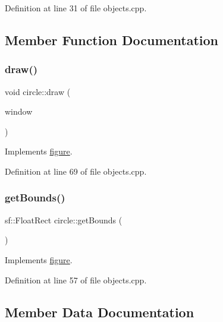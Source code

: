 Definition at line 31 of file objects.\+cpp.



\subsection{Member Function Documentation}
\mbox{\label{classcircle_a49a37a81d863f524935be5953142886a}} 
\subsubsection{\texorpdfstring{draw()}{draw()}}
{\footnotesize\ttfamily void circle\+::draw (\begin{DoxyParamCaption}\item[{sf\+::\+Render\+Window \&}]{window }\end{DoxyParamCaption})\hspace{0.3cm}{\ttfamily [virtual]}}



Implements \hyperlink{classfigure_a56d8a53a8bf2b82178aa476bac071596}{figure}.



Definition at line 69 of file objects.\+cpp.

\mbox{\label{classcircle_a8e0193c47ce75d0aed9b3501dbdd0499}} 
\subsubsection{\texorpdfstring{get\+Bounds()}{getBounds()}}
{\footnotesize\ttfamily sf\+::\+Float\+Rect circle\+::get\+Bounds (\begin{DoxyParamCaption}{ }\end{DoxyParamCaption})\hspace{0.3cm}{\ttfamily [virtual]}}



Implements \hyperlink{classfigure_aca9a3924bc0883e1aa8e93c04887abbc}{figure}.



Definition at line 57 of file objects.\+cpp.



\subsection{Member Data Documentation}
\mbox{\label{classcircle_a4b47ebebaf7c404bf7f644e8a96df46a}} 
